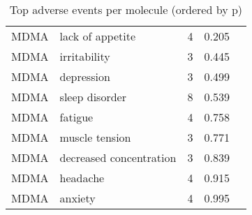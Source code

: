 \begin{table}[!h]
\centering
\caption{Top adverse events per molecule (ordered by p)}
\centering
\begin{tabular}[t]{llrll}
\toprule
MDMA & lack of appetite & 4 & 0.205 & \\
MDMA & irritability & 3 & 0.445 & \\
MDMA & depression & 3 & 0.499 & \\
MDMA & sleep disorder & 8 & 0.539 & \\
MDMA & fatigue & 4 & 0.758 & \\
\addlinespace
MDMA & muscle tension & 3 & 0.771 & \\
MDMA & decreased concentration & 3 & 0.839 & \\
MDMA & headache & 4 & 0.915 & \\
MDMA & anxiety & 4 & 0.995 & \\
\bottomrule
\end{tabular}
\end{table}
